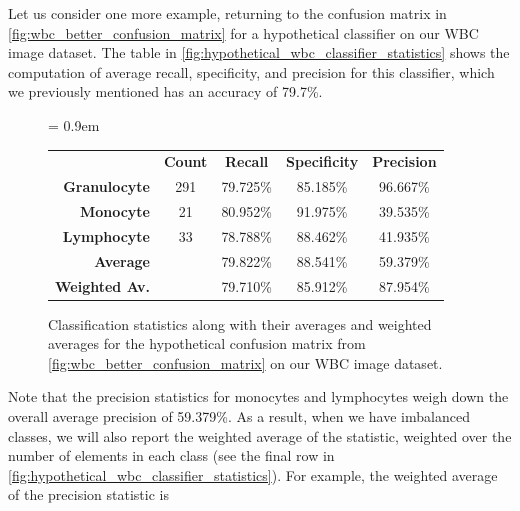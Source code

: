 \begin{qbox}\end{qbox}

Let us consider one more example, returning to the confusion matrix in \autoref{fig:wbc_better_confusion_matrix} for a hypothetical classifier on our WBC image dataset. The table in \autoref{fig:hypothetical_wbc_classifier_statistics} shows the computation of average recall, specificity, and precision for this classifier, which we previously mentioned has an accuracy of 79.7\%.\\

\begin{figure}[h]
\centering
\tabcolsep = 0.9em
\mySfFamily
{}
\begin{tabular}{r c c c c}
\rowcolor{gray!50}
& \textbf{Count} & \textbf{Recall} & \textbf{Specificity} & \textbf{Precision} \\
\textbf{Granulocyte} & 291 & 79.725\% & 85.185\% & 96.667\%\\
\textbf{Monocyte} & \phantom{2}21 & 80.952\% & 91.975\% & 39.535\% \\
\textbf{Lymphocyte} & \phantom{2}33 & 78.788\% & 88.462\% & 41.935\%\\
\textbf{Average} & & 79.822\% & 88.541\% & 59.379\%\\
\textbf{Weighted Av.} & & 79.710\% & 85.912\% & 87.954\%\\
\end{tabular}
\caption{Classification statistics along with their averages and weighted averages for the hypothetical confusion matrix from \autoref{fig:wbc_better_confusion_matrix} on our WBC image dataset.}
\label{fig:hypothetical_wbc_classifier_statistics}
\end{figure}

Note that the precision statistics for monocytes and lymphocytes weigh down the overall average precision of 59.379\%. As a result, when we have imbalanced classes, we will also report the weighted average of the statistic, weighted over the number of elements in each class (see the final row in \autoref{fig:hypothetical_wbc_classifier_statistics}). For example, the weighted average of the precision statistic is

